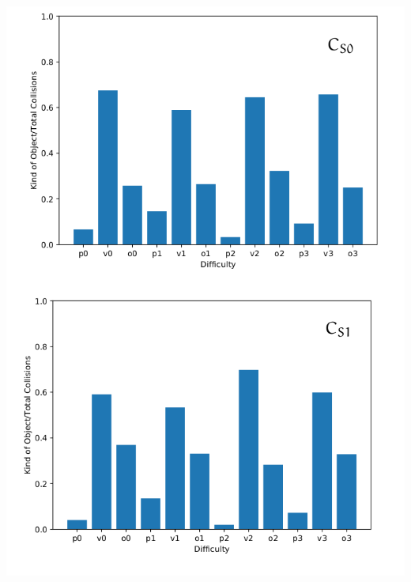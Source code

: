 \begin{minipage}[c]{\textwidth}
	\includegraphics[width=\textwidth]{img/hit-ratios-stupid-pro.png}
		
\end{minipage}

